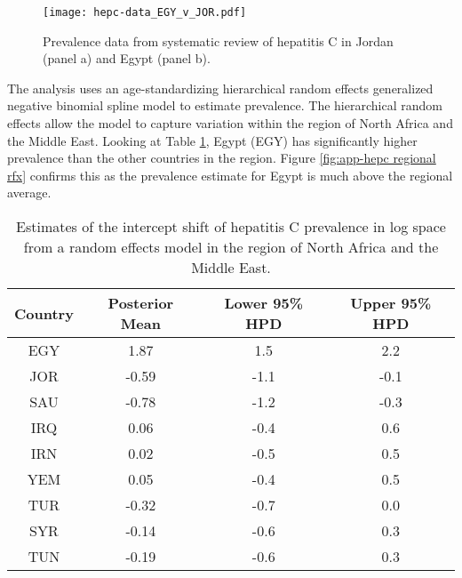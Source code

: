     \begin{figure}[h]
        \begin{center}
            \texttt{[image: hepc-data\_EGY\_v\_JOR.pdf]}
            \caption{Prevalence data from systematic review of hepatitis C in Jordan (panel a) and Egypt (panel b).}
            \label{fig:app-hepc data}
        \end{center}
    \end{figure}

The analysis uses an age-standardizing hierarchical random effects generalized negative binomial spline model to estimate prevalence.  The hierarchical random effects allow the model to capture variation within the region of North Africa and the Middle East.  Looking at Table \ref{tab:app-hepc regional rfx}, Egypt (EGY) has significantly higher prevalence than the other countries in the region.  Figure \ref{fig:app-hepc regional rfx} confirms this as the prevalence estimate for Egypt is much above the regional average.

    \begin{table}[h]
        \begin{center}
        \caption{ Estimates of the intercept shift of hepatitis C prevalence in log space from a random effects model in the region of North Africa and the Middle East.}
        \label{tab:app-hepc regional rfx}
        \begin{tabular}{|c|c|c|c|}
            \hline
                Country & Posterior Mean & Lower 95\% HPD  & Upper 95\%  HPD \\
            \hline
                EGY	&	1.87	&	 1.5	&	2.2	\\
                JOR	&	-0.59	&	-1.1	&	-0.1 \\
                SAU	&	-0.78	&	-1.2	&	-0.3 \\
                IRQ	&	0.06	&	-0.4	&	0.6	\\
                IRN	&	0.02	&	-0.5	&	0.5	\\
                YEM	&	0.05	&	-0.4	&	0.5	\\
                TUR	&	-0.32	&	-0.7	&	0.0	\\
                SYR	&	-0.14	&	-0.6	&	0.3	\\
                TUN	&	-0.19	&	-0.6	&	0.3	\\
            \hline
        \end{tabular}
        \end{center}
    \end{table}

